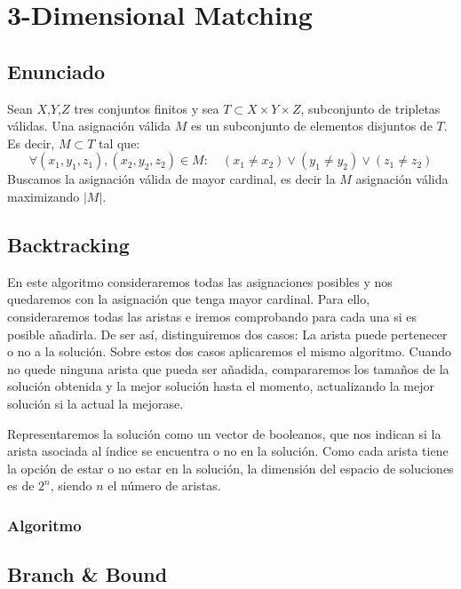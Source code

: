 \documentclass[a4paper, 11pt]{article} %
\begin{document}
\section{3-Dimensional Matching}
  \subsection{Enunciado}
    Sean $X$,$Y$,$Z$ tres conjuntos finitos y sea $T \subset X \times Y \times Z$, subconjunto de tripletas válidas.
    Una asignación válida $M$ es un subconjunto de elementos disjuntos de $T$. Es decir, $M \subset T$ tal que:
    \begin{equation}
     \forall (x_1,y_1,z_1), (x_2,y_2,z_2) \in M : \quad (x_1 \neq x_2) \vee (y_1 \neq y_2) \vee (z_1 \neq z_2)
    \end{equation} 
    Buscamos la asignación válida de mayor cardinal, es decir la $M$ asignación válida maximizando $|M|$.
    
  \subsection{Backtracking}
  En este algoritmo consideraremos todas las asignaciones posibles y nos quedaremos con la asignación que tenga mayor cardinal. 
  Para ello, consideraremos todas las aristas e iremos comprobando para cada una si es posible añadirla. De ser así, distinguiremos 
  dos casos: La arista puede pertenecer o no a la solución. Sobre estos dos casos aplicaremos el mismo algoritmo. Cuando no quede
  ninguna arista que pueda ser añadida, compararemos los tamaños de la solución obtenida y la mejor solución hasta el momento, 
  actualizando la mejor solución si la actual la mejorase. 
  
  Representaremos la solución como un vector de booleanos, que nos indican si la arista asociada al índice se encuentra o 
  no en la solución. Como cada arista tiene la opción de estar o no estar en la solución, la dimensión del espacio de 
  soluciones es de $2^n$, siendo $n$ el número de aristas.
  
  \subsubsection{Algoritmo}

        \small
  	\texttt{}
        \normalsize
  
  \subsection{Branch \& Bound}
  
\end{document}
